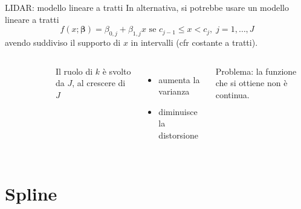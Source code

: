 \documentclass{beamer}\usepackage[]{graphicx}\usepackage[]{color}
\makeatletter
\newenvironment{kframe}{%
 \def\at@end@of@kframe{}%
 \ifinner\ifhmode%
  \def\at@end@of@kframe{\end{minipage}}%
  \begin{minipage}{\columnwidth}%
 \fi\fi%
 \def\FrameCommand##1{\hskip\@totalleftmargin \hskip-\fboxsep
 \colorbox{shadecolor}{##1}\hskip-\fboxsep
     \hskip-\linewidth \hskip-\@totalleftmargin \hskip\columnwidth}%
 \MakeFramed {\advance\hsize-\width
   \@totalleftmargin\z@ \linewidth\hsize
   \@setminipage}}%
 {\par\unskip\endMakeFramed%
 \at@end@of@kframe}
\newenvironment{knitrout}{}{} %
\newcommand{\vbeta}{\bm{\beta}}
\makeatother
\begin{document}
\begin{frame}[fragile]{LIDAR: modello lineare a tratti}
In alternativa, si potrebbe usare un modello lineare a tratti
\[ f(x;\vbeta) = \beta_{0,j} + \beta_{1,j} x \mbox{ se } c_{j-1}\leq x < c_j,\;j=1,\ldots,J \]
avendo suddiviso il supporto di $x$ in intervalli (cfr costante a tratti).
\begin{columns}[T]
\begin{knitrout}
\color{fgcolor}\begin{kframe}


{\ttfamily\noindent\bfseries{}}

{\ttfamily\noindent\bfseries{}}

{\ttfamily\noindent\bfseries{}}

{\ttfamily\noindent\bfseries\color{errorcolor}{Error in plot.xy(xy.coords(x, y), type = type, ...): plot.new has not been called yet}}\end{kframe}
\end{knitrout}
Il ruolo di $k$ \`e svolto da $J$, al crescere di $J$
\begin{itemize}
\item aumenta la varianza
\item diminuisce la distorsione
\end{itemize}
Problema: la funzione che si ottiene non \`e continua.
\end{columns}

\end{frame}



\section{Spline}
\end{document}

